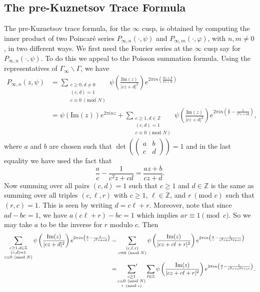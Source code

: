 \documentclass[12pt]{book}
\theoremstyle{definition}\newframedtheorem{method}{Method}
\newcommand{\psum}{\sideset{}{'}\sum}
\newcommand{\tmod}[1]{\ \left(\text{mod }#1\right)}
\newcommand{\Z}{\mathbb{Z}}
\newcommand{\G}{\Gamma}
\newcommand{\vphi}{\varphi}
\newcommand{\<}{\langle}
\renewcommand{\>}{\rangle}
\renewcommand{\Im}{\mathrm{Im}}
\newcommand{\GG}{\G_{\infty}\backslash\G}
\begin{document}
    \subsection*{The pre-Kuznetsov Trace Formula}
      The pre-Kuznetsov trace formula, for the $\infty$ cusp, is obtained by computing the inner product of two Poincar\'e  series $P_{\infty,n}(\cdot,\psi)$ and $P_{\infty,m}(\cdot,\vphi)$, with $n,m \neq 0$, in two different ways. We first need the Fourier series at the $\infty$ cusp say for $P_{\infty,n}(\cdot,\psi)$. To do this we appeal to the Poisson summation formula. Using the representatives of $\GG$, we have
      \begin{align*}
        P_{\infty,n}(z,\psi) &= \sum_{\substack{c \ge 0, d \neq 0 \\ (c,d) = 1 \\ c \equiv 0 \tmod{N}}}\psi\left(\frac{\Im(z)}{|cz+d|^{2}}\right)e^{2\pi in\left(\frac{az+b}{cz+d}\right)} \\
        &= \psi(\Im(z))e^{2\pi inz}+\sum_{\substack{c \ge 1, d \in \Z \\ (c,d) = 1 \\ c \equiv 0 \tmod{N}}}\psi\left(\frac{\Im(z)}{|cz+d|^{2}}\right)e^{2\pi in\left(\frac{a}{c}-\frac{1}{c^{2}z+cd}\right)},
      \end{align*}
      where $a$ and $b$ are chosen such that $\det\left(\begin{pmatrix} a & b \\ c & d \end{pmatrix}\right) = 1$ and in the last equality we have used the fact that
      \[
        \frac{a}{c}-\frac{1}{c^{2}z+cd} = \frac{az+b}{cz+d}.
      \]
      Now summing over all pairs $(c,d) = 1$ such that $c \ge 1$ and $d \in \Z$ is the same as summing over all triples $(c,\ell,r)$ with $c \ge 1$, $\ell \in \Z$, and $r \tmod{c}$ such that $(r,c) = 1$. This is seen by writing $d = c\ell+r$. Moreover, note that since $ad-bc = 1$, we have $a(c\ell+r)-bc = 1$ which implies $ar \equiv 1 \pmod{c}$. So we may take $a$ to be the inverse for $r$ modulo $c$. Then
      \begin{align*}
        \sum_{\substack{c \ge 1, d \in \Z \\ (c,d) = 1 \\ c \equiv 0 \tmod{N}}}\psi\left(\frac{\Im(z)}{|cz+d|^{2}}\right)e^{2\pi in\left(\frac{a}{c}-\frac{1}{c^{2}z+cd}\right)} &= \sum_{\substack{(c,\ell,r) \\ c \equiv 0 \tmod{N}}}\psi\left(\frac{\Im(z)}{|cz+c\ell+r|^{2}}\right)e^{2\pi in\left(\frac{a}{c}-\frac{1}{c^{2}z+c^{2}\ell+cr}\right)} \\
        &= \psum_{\substack{c \ge 1 \\ c \equiv 0 \tmod{N} \\ r \tmod{c}}}\sum_{\ell \in \Z}\psi\left(\frac{\Im(z)}{|cz+c\ell+r|^{2}}\right)e^{2\pi in\left(\frac{a}{c}-\frac{1}{c^{2}z+c^{2}\ell+cr}\right)}.
      \end{align*}
\end{document}
